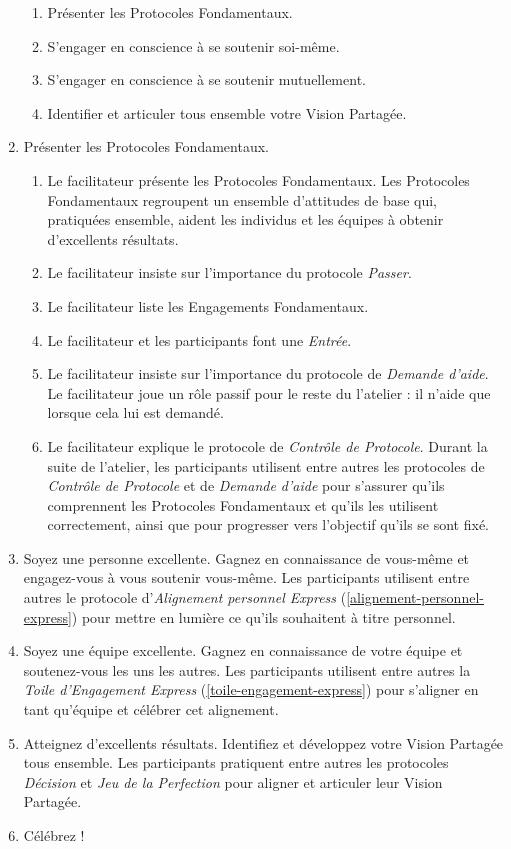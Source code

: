\documentclass[paper=6in:9in,pagesize=pdftex,headinclude=on,footinclude=on,12pt]{scrbook}
\newcommand*{\numref}[1]{{\hyperref[{#1}]{\autoref*{#1}}}}
\begin{document}
\begin{enumerate}
	      \begin{enumerate}
	      	\item Présenter les Protocoles Fondamentaux.
	      	\item S'engager en conscience à se soutenir soi-même.
	      	\item S'engager en conscience à se soutenir mutuellement.
	      	\item Identifier et articuler tous ensemble votre Vision Partagée.
	      \end{enumerate}
	\item Présenter les Protocoles Fondamentaux.
	      \begin{enumerate}
	      	\item Le facilitateur présente les Protocoles Fondamentaux. Les Protocoles Fondamentaux regroupent un ensemble d'attitudes de base qui, pratiquées
	      	      ensemble, aident les individus et les équipes à obtenir d'excellents résultats.
	      	\item Le facilitateur insiste sur l'importance du protocole \emph{Passer}.
	      	\item Le facilitateur liste les Engagements Fondamentaux.
	      	\item Le facilitateur et les participants font une \emph{Entrée}.
	      	\item Le facilitateur insiste sur l'importance du protocole de \emph{Demande d'aide}. Le facilitateur joue un rôle passif pour le reste du l'atelier :
	      	      il n'aide que lorsque cela lui est demandé.
	      	\item Le facilitateur explique le protocole de \emph{Contrôle de Protocole}. Durant la suite de l'atelier, les participants utilisent entre autres les
	      	      protocoles de \emph{Contrôle de Protocole} et de \emph{Demande d'aide} pour s'assurer qu'ils comprennent les Protocoles Fondamentaux et qu'ils les
	      	      utilisent correctement, ainsi que pour progresser vers l'objectif qu'ils se sont fixé.
	      \end{enumerate}
	\item Soyez une personne excellente. Gagnez en connaissance de vous-même et engagez-vous à vous soutenir vous-même. Les participants utilisent entre
	      autres le protocole d'\emph{Alignement personnel Express} (\numref{alignement-personnel-express}) pour mettre en lumière ce qu'ils souhaitent à titre personnel.
   	\item Soyez une équipe excellente. Gagnez en connaissance de votre équipe et soutenez-vous les uns les autres. Les participants utilisent entre autres la
   	      \emph{Toile d'Engagement Express} (\numref{toile-engagement-express}) pour s'aligner en tant qu'équipe et célébrer cet alignement.
   	\item Atteignez d'excellents résultats. Identifiez et développez votre Vision Partagée tous ensemble. Les participants pratiquent entre autres les protocoles
   	      \emph{Décision} et \emph{Jeu de la Perfection} pour aligner et articuler leur Vision Partagée.
   	\item Célébrez !
\end{enumerate}
\end{document}
